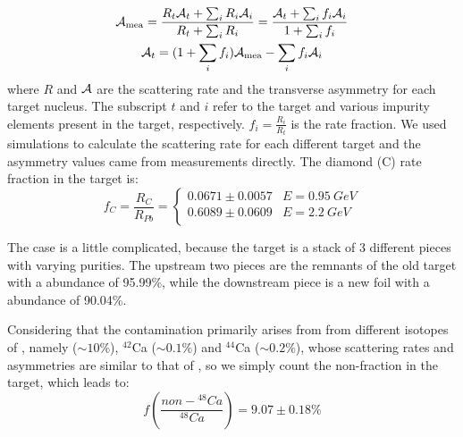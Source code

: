 \begin{equation}
    \begin{gathered}
	\mathcal{A}_{\text{mea}} = \frac{R_t\mathcal{A}_t + \sum_i R_i \mathcal{A}_i}{R_t + \sum_i R_i} = \frac{\mathcal{A}_t + \sum_i f_i \mathcal{A}_i}{1 + \sum_i f_i}  \\
	\mathcal{A}_t = (1 + \sum_i f_i)\mathcal{A}_{\text{mea}} - \sum_i f_i\mathcal{A}_i
    \end{gathered}
    \label{eq:AT-asymmetry_correction}
\end{equation}
where $R$ and $\mathcal{A}$ are the scattering rate and the transverse asymmetry for each 
target nucleus. The subscript $t$ and $i$ refer to the target and various 
impurity elements present in the target, respectively. 
$f_i = \frac{R_i}{R_t}$ is the rate fraction. 
We used simulations to calculate the scattering rate for each different
target and the asymmetry values came from measurements directly. The diamond (C) rate fraction
in the \Pb target is:
\begin{equation}
    f_C = \frac{R_C}{R_{Pb}} = 
    \begin{cases}
	0.0671 \pm 0.0057   & E = 0.95\ GeV	\\
	0.6089 \pm 0.0609   & E = 2.2\ GeV	\\
    \end{cases}
\end{equation}

The \Ca case is a little complicated, because the \Ca target is a stack of 3 different
pieces with varying purities. The upstream two pieces are the remnants of the 
old target with a \Ca abundance of 95.99\%, while the downstream piece is a new foil
with a \Ca abundance of 90.04\%. 

Considering that the contamination primarily arises from 
from different isotopes of \Ca, namely \ca ($\sim10\%$), ${}^{42}$Ca ($\sim0.1\%$) 
and ${}^{44}$Ca ($\sim0.2\%$), 
whose scattering rates and asymmetries are similar to that of \Ca, so we simply 
count the non-\Ca fraction in the \Ca target, which leads to:
\begin{equation}
    f(\frac{non-{}^{48}Ca}{{}^{48}Ca}) = 9.07 \pm 0.18 \%
\end{equation}

